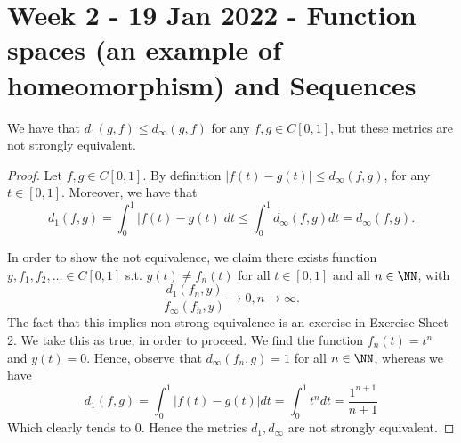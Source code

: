 \section{Week 2 - 19 Jan 2022 - Function spaces (an example of homeomorphism)
and Sequences}
\begin{proposition}
  We have that $d_1(g,f)\leq d_{\infty}(g,f)$ for any $f,g\in C[0,1]$, but these
  metrics are not strongly equivalent.
  \label{prop:C01metricsNotEq}
\end{proposition}
\begin{proof}
  Let $f,g\in C[0,1]$. By definition $|f(t)-g(t)|\leq d_{\infty}(f,g)$, for any
  $t\in [0,1]$. Moreover, we have that 
  \[d_{1}(f,g)=\int_{0}^1 |f(t)-g(t)|dt \leq \int_0^1d_{\infty}(f,g)dt =
  d_{\infty}(f,g).\]

  In order to show the not equivalence, we claim there exists function
  $y,f_1,f_2,\dots\in C[0,1]$ s.t. $y(t)\neq f_n(t)$ for all $t\in [0,1]$ and
  all $n\in\NN$, with 
  \[\frac{d_{1}(f_n,y)}{f_{\infty}(f_n,y)}\to 0, n\to\infty.\]
  The fact that this implies non-strong-equivalence is an exercise in Exercise
  Sheet 2. We take this as true, in order to proceed. We find the function
  $f_n(t)=t^n$ and $y(t)=0$. Hence, observe that $d_{\infty}(f_n,g)=1$ for all
  $n\in\NN$, whereas we have 
  \[d_1(f,g)= \int_0^1 |f(t)-g(t)|dt = \int_0^1t^n dt = \frac{1^{n+1}}{n+1}\]
  Which clearly tends to $0$. Hence the metrics $d_1, d_{\infty}$ are not
  strongly equivalent.
\end{proof}

